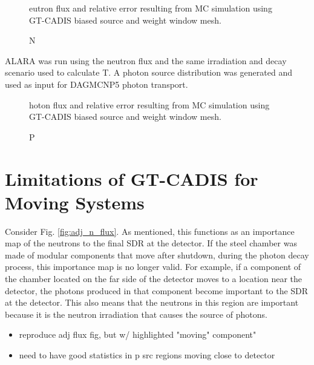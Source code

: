 \begin{figure} \label{fig:gt_nflux}
  \caption Neutron flux and relative error resulting from MC simulation using
  GT-CADIS biased source and weight window mesh.
\end{figure}


ALARA was run using the neutron flux and the same irradiation and decay scenario used to calculate
T.  A photon source distribution was generated and used as input for DAGMCNP5
photon transport.  

\begin{figure} \label{fig:gt_pflux}
  \caption Photon flux and relative error resulting from MC simulation using
  GT-CADIS biased source and weight window mesh.
\end{figure}



\section{Limitations of GT-CADIS for Moving Systems}

Consider Fig. \ref{fig:adj_n_flux}.  As mentioned, this functions as an
importance map of the neutrons to the final SDR at the detector.  If the steel
chamber was made of modular components that move after shutdown, during the
photon decay process, this importance map is no longer valid.  For example, if
a component of the chamber located on the far side of the detector moves to a
location near the detector, the photons produced in that component become
important to the SDR at the detector.  This also means that the neutrons in
this region are important because it is the neutron irradiation that causes the
source of photons.


\begin{itemize}
	\item reproduce adj flux fig, but w/ highlighted "moving" component"
	\item need to have good statistics in p src regions moving
			close to detector
\end{itemize}
